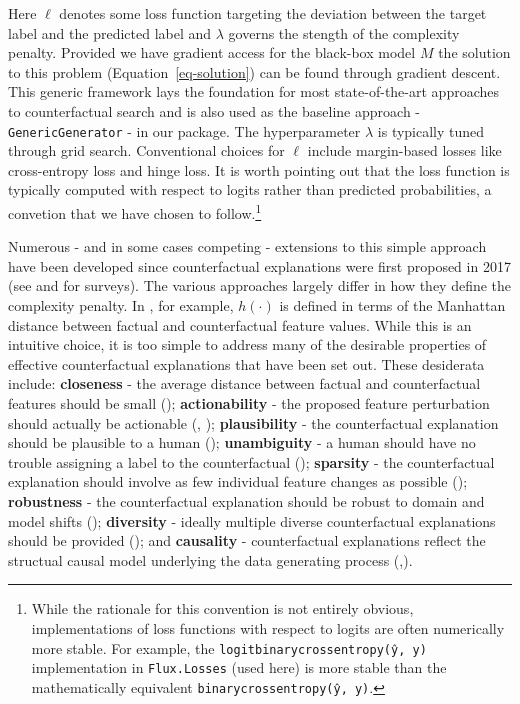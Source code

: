 \documentclass{juliacon}
\begin{document}
Here \(\ell\) denotes some loss function targeting the deviation between
the target label and the predicted label and \(\lambda\) governs the
stength of the complexity penalty. Provided we have gradient access for
the black-box model \(M\) the solution to this problem
(Equation~\ref{eq-solution}) can be found through gradient descent. This
generic framework lays the foundation for most state-of-the-art
approaches to counterfactual search and is also used as the baseline
approach - \texttt{GenericGenerator} - in our package. The
hyperparameter \(\lambda\) is typically tuned through grid search.
Conventional choices for \(\ell\) include margin-based losses like
cross-entropy loss and hinge loss. It is worth pointing out that the
loss function is typically computed with respect to logits rather than
predicted probabilities, a convetion that we have chosen to
follow.\footnote{While the rationale for this convention is not entirely
  obvious, implementations of loss functions with respect to logits are
  often numerically more stable. For example, the
  \texttt{logitbinarycrossentropy(ŷ,\ y)} implementation in
  \texttt{Flux.Losses} (used here) is more stable than the
  mathematically equivalent \texttt{binarycrossentropy(ŷ,\ y)}.}

Numerous - and in some cases competing - extensions to this simple
approach have been developed since counterfactual explanations were
first proposed in 2017 (see \cite{verma2020counterfactual} and
\cite{karimi2020survey} for surveys). The various approaches largely
differ in how they define the complexity penalty. In
\cite{wachter2017counterfactual}, for example, \(h(\cdot)\) is defined
in terms of the Manhattan distance between factual and counterfactual
feature values. While this is an intuitive choice, it is too simple to
address many of the desirable properties of effective counterfactual
explanations that have been set out. These desiderata include:
\textbf{closeness} - the average distance between factual and
counterfactual features should be small
(\cite{wachter2017counterfactual}); \textbf{actionability} - the
proposed feature perturbation should actually be actionable
(\cite{ustun2019actionable}, \cite{poyiadzi2020face});
\textbf{plausibility} - the counterfactual explanation should be
plausible to a human (\cite{joshi2019towards}); \textbf{unambiguity} - a
human should have no trouble assigning a label to the counterfactual
(\cite{schut2021generating}); \textbf{sparsity} - the counterfactual
explanation should involve as few individual feature changes as possible
(\cite{schut2021generating}); \textbf{robustness} - the counterfactual
explanation should be robust to domain and model shifts
(\cite{upadhyay2021towards}); \textbf{diversity} - ideally multiple
diverse counterfactual explanations should be provided
(\cite{mothilal2020explaining}); and \textbf{causality} - counterfactual
explanations reflect the structual causal model underlying the data
generating process
(\cite{karimi2020algorithmic},\cite{karimi2021algorithmic}).
\end{document}
